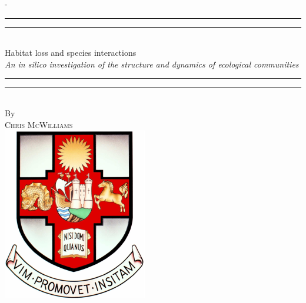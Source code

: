 %
%
% 
%
%
\begin{titlingpage}
\begin{SingleSpace}
\calccentering{\unitlength} 
\begin{adjustwidth*}{\unitlength}{-\unitlength}
\vspace*{13mm}
\begin{center}
\rule[0.5ex]{\linewidth}{2pt}\vspace*{-\baselineskip}\vspace*{3.2pt}
\rule[0.5ex]{\linewidth}{1pt}\\[\baselineskip]
{\HUGE Habitat loss and species interactions }\\[4mm]
{\Large \textit{An in silico investigation of the structure and dynamics of ecological communities}}\\
\rule[0.5ex]{\linewidth}{1pt}\vspace*{-\baselineskip}\vspace{3.2pt}
\rule[0.5ex]{\linewidth}{2pt}\\
\vspace{6.5mm}
{\large By}\\
\vspace{6.5mm}
{\large\textsc{Chris McWilliams}}\\
\vspace{11mm}
\includegraphics[scale=0.6]{logos/bristolcrest_colour}\\

\end{center}
\end{adjustwidth*}
\end{SingleSpace}
\end{titlingpage}
